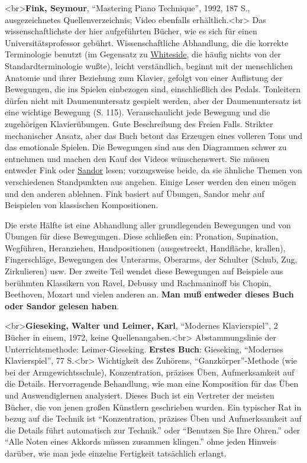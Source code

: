 <br>\textbf{Fink, Seymour}, \enquote{Mastering Piano Technique}, 1992, 187 S., ausgezeichnetes Quellenverzeichnis; Video ebenfalls erhältlich.<br>
Das wissenschaftlichste der hier aufgeführten Bücher, wie es sich für einen Universitätsprofessor gebührt.
Wissenschaftliche Abhandlung, die die korrekte Terminologie benutzt (im Gegensatz zu \hyperref[Whiteside]{Whiteside}, die häufig nichts von der Standardterminologie wußte), leicht verständlich, beginnt mit der menschlichen Anatomie und ihrer Beziehung zum Klavier, gefolgt von einer Auflistung der Bewegungen, die ins Spielen einbezogen sind, einschließlich des Pedals.
Tonleitern dürfen nicht mit Daumenuntersatz gespielt werden, aber der Daumenuntersatz ist eine wichtige Bewegung (S. 115).
Veranschaulicht jede Bewegung und die zugehörigen Klavierübungen.
Gute Beschreibung des Freien Falls.
Strikter mechanischer Ansatz, aber das Buch betont das Erzeugen eines volleren Tons und das emotionale Spielen.
Die Bewegungen sind aus den Diagrammen schwer zu entnehmen und machen den Kauf des Videos wünschenswert.
Sie müssen entweder Fink oder \hyperref[Sandor]{Sandor} lesen; vorzugsweise beide, da sie ähnliche Themen von verschiedenen Standpunkten aus angehen.
Einige Leser werden den einen mögen und den anderen ablehnen.
Fink basiert auf Übungen, Sandor mehr auf Beispielen von klassischen Kompositionen.

Die erste Hälfte ist eine Abhandlung aller grundlegenden Bewegungen und von Übungen für diese Bewegungen.
Diese schließen ein: Pronation, Supination, Wegführen, Heranziehen, Handpositionen (ausgestreckt, Handfläche, krallen), Fingerschläge, Bewegungen des Unterarms, Oberarms, der Schulter (Schub, Zug, Zirkulieren) usw.
Der zweite Teil wendet diese Bewegungen auf Beispiele aus berühmten Klassikern von Ravel, Debussy und Rachmaninoff bis Chopin, Beethoven, Mozart und vielen anderen an. \textbf{Man muß entweder dieses Buch oder Sandor gelesen haben}.


\label{Gieseking}

<br>\textbf{Gieseking, Walter und Leimer, Karl}, \enquote{Modernes Klavierspiel}, 2 Bücher in einem, 1972, keine Quellenangaben.<br>
Abstammungslinie der Unterrichtsmethode: Leimer-Gieseking.
\textbf{Erstes Buch}: Gieseking, \enquote{Modernes Klavierspiel}, 77 S.<br>
Wichtigkeit des Zuhörens, \enquote{Ganzkörper}-Methode (wie bei der Armgewichtsschule), Konzentration, präzises Üben, Aufmerksamkeit auf die Details.
Hervorragende Behandlung, wie man eine Komposition für das Üben und Auswendiglernen analysiert.
Dieses Buch ist ein Vertreter der meisten Bücher, die von jenen großen Künstlern geschrieben wurden.
Ein typischer Rat in bezug auf die Technik ist \enquote{Konzentration, präzises Üben und Aufmerksamkeit auf die Details führt automatisch zur Technik.} oder \enquote{Benutzen Sie Ihre Ohren.} oder \enquote{Alle Noten eines Akkords müssen zusammen klingen.} ohne jeden Hinweis darüber, wie man jede einzelne Fertigkeit tatsächlich erlangt.

